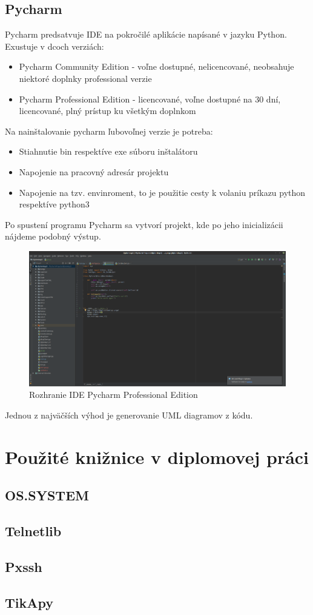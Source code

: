 \section{Pycharm}
Pycharm predsatvuje IDE na pokročilé aplikácie napísané v jazyku Python. Exustuje v dcoch verziách:\begin{itemize}
\item Pycharm Community Edition - voľne dostupné, nelicencované, neobsahuje niektoré doplnky professional verzie
\item Pycharm Professional Edition - licencované, voľne dostupné na 30 dní, licencované, plný prístup ku všetkým doplnkom
\end{itemize}
Na nainštalovanie pycharm ľubovoľnej verzie je potreba:\begin{itemize}
\item Stiahnutie bin respektíve exe súboru inštalátoru
\item Napojenie na pracovný adresár projektu
\item Napojenie na tzv. envinroment, to je použitie cesty k volaniu príkazu python respektíve python3
\end{itemize}
Po spustení programu Pycharm sa vytvorí projekt, kde po jeho inicializácii nájdeme podobný výstup.
\begin{figure}[H]
\centering
\includegraphics[scale=0.25]{../text/pycharm.png}
\caption{Rozhranie IDE Pycharm Professional Edition}
\label{fig:webfig}
\end{figure} 
Jednou z najväčších výhod je generovanie UML diagramov z kódu.
\chapter{Použité knižnice v diplomovej práci}
\section{OS.SYSTEM}
\section{Telnetlib}
\section{Pxssh}
\section{TikApy}




